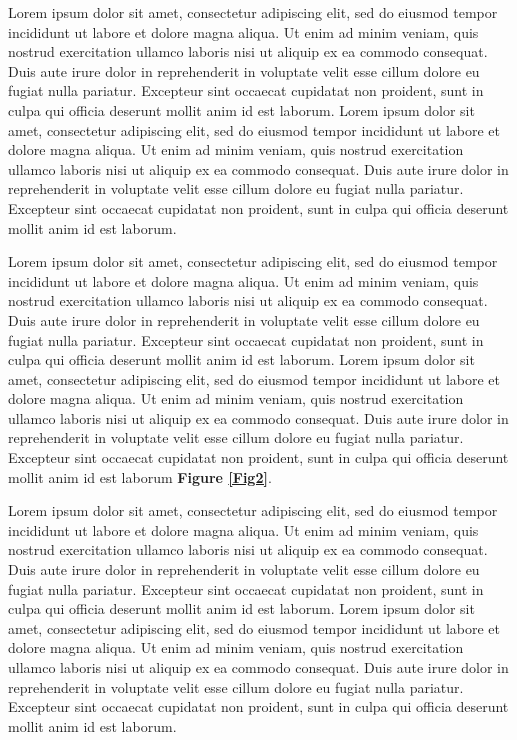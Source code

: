 \documentclass[english]{sbc2025}%
\begin{document}
Lorem ipsum dolor sit amet, consectetur adipiscing elit, sed do eiusmod tempor incididunt ut labore et dolore magna aliqua. Ut enim ad minim veniam, quis nostrud exercitation ullamco laboris nisi ut aliquip ex ea commodo consequat. Duis aute irure dolor in reprehenderit in voluptate velit esse cillum dolore eu fugiat nulla pariatur. Excepteur sint occaecat cupidatat non proident, sunt in culpa qui officia deserunt mollit anim id est laborum. Lorem ipsum dolor sit amet, consectetur adipiscing elit, sed do eiusmod tempor incididunt ut labore et dolore magna aliqua. Ut enim ad minim veniam, quis nostrud exercitation ullamco laboris nisi ut aliquip ex ea commodo consequat. Duis aute irure dolor in reprehenderit in voluptate velit esse cillum dolore eu fugiat nulla pariatur. Excepteur sint occaecat cupidatat non proident, sunt in culpa qui officia deserunt mollit anim id est laborum.

Lorem ipsum dolor sit amet, consectetur adipiscing elit, sed do eiusmod tempor incididunt ut labore et dolore magna aliqua. Ut enim ad minim veniam, quis nostrud exercitation ullamco laboris nisi ut aliquip ex ea commodo consequat. Duis aute irure dolor in reprehenderit in voluptate velit esse cillum dolore eu fugiat nulla pariatur. Excepteur sint occaecat cupidatat non proident, sunt in culpa qui officia deserunt mollit anim id est laborum. Lorem ipsum dolor sit amet, consectetur adipiscing elit, sed do eiusmod tempor incididunt ut labore et dolore magna aliqua. Ut enim ad minim veniam, quis nostrud exercitation ullamco laboris nisi ut aliquip ex ea commodo consequat. Duis aute irure dolor in reprehenderit in voluptate velit esse cillum dolore eu fugiat nulla pariatur. Excepteur sint occaecat cupidatat non proident, sunt in culpa qui officia deserunt mollit anim id est laborum \textbf{Figure \ref{Fig2}}.

Lorem ipsum dolor sit amet, consectetur adipiscing elit, sed do eiusmod tempor incididunt ut labore et dolore magna aliqua. Ut enim ad minim veniam, quis nostrud exercitation ullamco laboris nisi ut aliquip ex ea commodo consequat. Duis aute irure dolor in reprehenderit in voluptate velit esse cillum dolore eu fugiat nulla pariatur. Excepteur sint occaecat cupidatat non proident, sunt in culpa qui officia deserunt mollit anim id est laborum. Lorem ipsum dolor sit amet, consectetur adipiscing elit, sed do eiusmod tempor incididunt ut labore et dolore magna aliqua. Ut enim ad minim veniam, quis nostrud exercitation ullamco laboris nisi ut aliquip ex ea commodo consequat. Duis aute irure dolor in reprehenderit in voluptate velit esse cillum dolore eu fugiat nulla pariatur. Excepteur sint occaecat cupidatat non proident, sunt in culpa qui officia deserunt mollit anim id est laborum.
\end{document}
